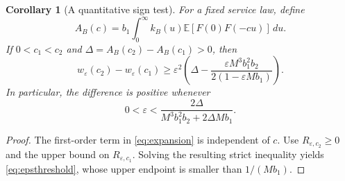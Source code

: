 \documentclass[aap,preprint]{imsart}
\numberwithin{equation}{section}
\theoremstyle{plain}
\newtheorem{corollary}[theorem]{Corollary}
\theoremstyle{definition}
\newcommand{\E}{\mathbb E}
\newcommand{\1}{\mathbf 1}
\newcommand{\eps}{\varepsilon}
\begin{document}
\begin{corollary}[A quantitative sign test]\label{cor:signtest}
For a fixed service law, define
\begin{equation}\label{eq:coefficient}
 A_B(c)=b_1\int_0^\infty k_B(u)\E[F(0)F(-cu)]\,du.
\end{equation}
If $0<c_1<c_2$ and $\Delta=A_B(c_2)-A_B(c_1)>0$, then
\begin{equation}\label{eq:signlower}
 w_\eps(c_2)-w_\eps(c_1)
 \ge\eps^2\left(\Delta-
 \frac{\eps M^3b_1^2b_2}{2(1-\eps M b_1)}\right).
\end{equation}
In particular, the difference is positive whenever
\begin{equation}\label{eq:epsthreshold}
 0<\eps<\frac{2\Delta}{M^3b_1^2b_2+2\Delta M b_1}.
\end{equation}
\end{corollary}
\begin{proof}
The first-order term in \eqref{eq:expansion} is independent of $c$. Use $R_{\eps,c_2}\ge0$ and the upper bound on $R_{\eps,c_1}$. Solving the resulting strict inequality yields \eqref{eq:epsthreshold}, whose upper endpoint is smaller than $1/(M b_1)$.
\end{proof}
\end{document}
